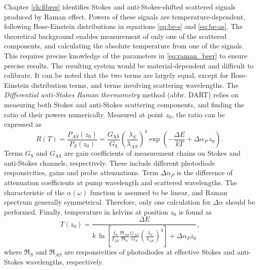 \documentclass{standalone}
\begin{document}
Chapter \ref{ch:fibres} identifies Stokes and anti-Stokes-shifted scattered signals produced by Raman effect. Powers of these signals are temperature-dependent, following Bose-Einstein distributions in equations \ref{eq:be-s} and \ref{eq:be-as}. The theoretical background enables measurement of only one of the scattered components, and calculating the absolute temperature from one of the signals. This requires precise knowledge of the parameters in \ref{eq:raman_beer} to ensure precise results. The resulting system would be material-dependent and difficult to calibrate. It can be noted that the two terms are largely equal, except for Bose-Einstein distribution terms, and terms involving scattering wavelengths. The \textit{Differential anti-Stokes Raman thermometry} method (abbr. DART) relies on measuring both Stokes and anti-Stokes scattering components, and finding the ratio of their powers numerically. Measured at point $z_0$, the ratio can be expressed as
\begin{equation}
R(T) = \frac{P_{AS}(z_0)}{P_S(z_0)} = \frac{G_\textrm{AS}}{G_\textrm{S}} \left( \frac{\lambda_S}{\lambda_{AS}} \right)^4 \exp\left( - \frac{\varDelta E}{k T} + \varDelta \alpha_P \, z_0 \right) \textrm{.}
\end{equation}
Terms $G_\textrm{S}$ and $G_\textrm{AS}$ are gain coefficients of measurement chains on Stokes and anti-Stokes channels, respectively. These include different photodiode responsivities, gains and probe attenuations. Term $\varDelta \alpha_P$ is the difference of attenuation coefficients at pump wavelength and scattered wavelengths. The characteristic of the $\alpha(\omega)$ function is assumed to be linear, and Raman spectrum generally symmetrical. Therefore, only one calculation for $\varDelta \alpha$ should be performed. Finally, temperature in kelvins at position $z_0$ is found as
\begin{equation} \label{eq:stokes_temperature}
T(z_0) = \frac{\varDelta E}{k \, \ln \left[ \frac{I_S}{I_{AS}} \frac{\Re_{AS}}{\Re_S} \frac{G_{AS}}{G_S} \left(\frac{\lambda_S}{\lambda_{AS}}\right)^4 \right] + \varDelta \alpha_P z_0 } \textrm{,}
\end{equation}
where $\Re_S$ and $\Re_{AS}$ are responsivities of photodiodes at effective Stokes and anti-Stokes wavelengths, respectively.



\setcounter{stranica}{\thepage}
\addtocounter{stranica}{1}
\end{document}
